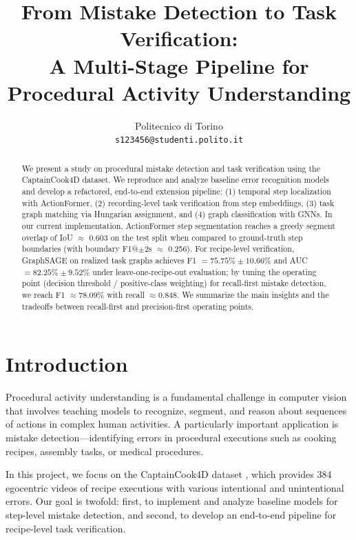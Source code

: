 \documentclass[10pt,twocolumn,letterpaper]{article}
\begin{document}
\title{From Mistake Detection to Task Verification: \\A Multi-Stage Pipeline for Procedural Activity Understanding}

\author{
Politecnico di Torino\\
{\tt\small s123456@studenti.polito.it}
}

\maketitle

\begin{abstract}
We present a study on procedural mistake detection and task verification using the CaptainCook4D dataset. We reproduce and analyze baseline error recognition models and develop a refactored, end-to-end extension pipeline: (1) temporal step localization with ActionFormer, (2) recording-level task verification from step embeddings, (3) task graph matching via Hungarian assignment, and (4) graph classification with GNNs. In our current implementation, ActionFormer step segmentation reaches a greedy segment overlap of IoU $\approx$ 0.603 on the test split when compared to ground-truth step boundaries (with boundary F1@$\pm$2s $\approx$ 0.256). For recipe-level verification, GraphSAGE on realized task graphs achieves F1 $= 75.75\% \pm 10.66\%$ and AUC $= 82.25\% \pm 9.52\%$ under leave-one-recipe-out evaluation; by tuning the operating point (decision threshold / positive-class weighting) for recall-first mistake detection, we reach F1 $\approx 78.09\%$ with recall $\approx 0.848$. We summarize the main insights and the tradeoffs between recall-first and precision-first operating points.
\end{abstract}

\section{Introduction}

Procedural activity understanding is a fundamental challenge in computer vision that involves teaching models to recognize, segment, and reason about sequences of actions in complex human activities. A particularly important application is mistake detection---identifying errors in procedural executions such as cooking recipes, assembly tasks, or medical procedures.

In this project, we focus on the CaptainCook4D dataset \cite{peddi2024captaincook4d}, which provides 384 egocentric videos of recipe executions with various intentional and unintentional errors. Our goal is twofold: first, to implement and analyze baseline models for step-level mistake detection, and second, to develop an end-to-end pipeline for recipe-level task verification.
\end{document}
